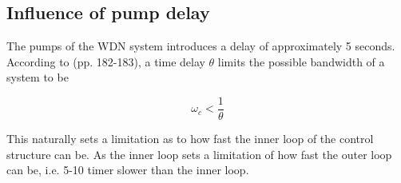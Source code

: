 \subsection{Influence of pump delay}
The pumps of the WDN system introduces a delay of approximately 5 seconds. According to \cite{Skogestad2005} (pp. 182-183), 
a time delay $\theta$ limits the possible bandwidth of a system to be 

\begin{equation}\label{eq:BWdelay}
	\omega_c < \frac{1}{\theta}
\end{equation}

This naturally sets a limitation as to how fast the inner loop of the control structure can be. As the inner loop sets a limitation of how fast the outer loop can be, i.e. 5-10 timer slower than the inner loop.

